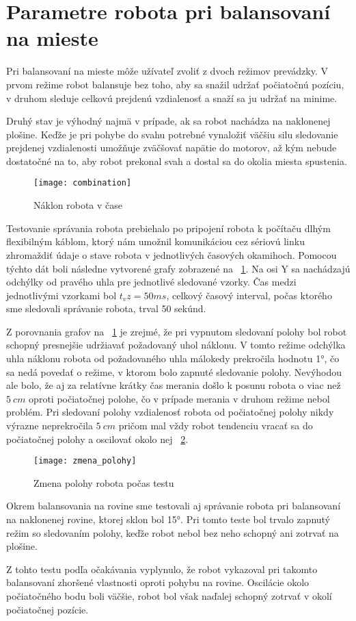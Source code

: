 \section{Parametre robota pri balansovaní na mieste}
Pri balansovaní na mieste môže užívateľ zvoliť z dvoch režimov prevádzky. V prvom režime robot balansuje bez toho, aby sa snažil udržať počiatočnú pozíciu, v druhom sleduje celkovú prejdenú vzdialenosť a snaží sa ju udržať na minime. 

Druhý stav je výhodný najmä v prípade, ak sa robot nachádza na naklonenej plošine. Keďže je pri pohybe do svahu potrebné vynaložiť väčšiu silu sledovanie prejdenej vzdialenosti umožňuje zväčšovať napätie do motorov, až kým nebude dostatočné na to, aby robot prekonal svah a dostal sa do okolia miesta spustenia.
\begin{figure}[h!]
\centering
\texttt{[image: combination]}
\caption{Náklon robota v čase}
\label{fig:combination}
\end{figure}   
Testovanie správania robota prebiehalo po pripojení robota k počítaču dlhým flexibilným káblom, ktorý nám umožnil komunikáciou cez sériovú linku zhromaždiť údaje o stave robota v jednotlivých časových okamihoch. Pomocou týchto dát boli následne vytvorené grafy zobrazené na  \figurename~\ref{fig:combination}. Na osi Y sa nachádzajú odchýlky od pravého uhla pre jednotlivé sledované vzorky. Čas medzi jednotlivými vzorkami bol $t_vz = 50ms$, celkový časový interval, počas ktorého sme sledovali správanie robota, trval 50 sekúnd.

Z porovnania grafov na \figurename~\ref{fig:combination} je zrejmé, že pri vypnutom sledovaní polohy bol robot schopný presnejšie udržiavať požadovaný uhol náklonu. V tomto režime odchýlka uhla náklonu robota od požadovaného uhla málokedy prekročila hodnotu 1°, čo sa nedá povedať o režime, v ktorom bolo zapnuté sledovanie polohy. Nevýhodou ale bolo, že aj za relatívne krátky čas merania došlo k posunu robota o viac než $5~cm$ oproti počiatočnej polohe, čo v prípade merania v druhom režime nebol problém. Pri sledovaní polohy vzdialenosť robota od počiatočnej polohy nikdy výrazne neprekročila $5~cm$ pričom mal vždy robot tendenciu vracať sa do počiatočnej polohy a oscilovať okolo nej \figurename~\ref{fig:zmena_polohy}.
 
\begin{figure}[h!]
\centering
\texttt{[image: zmena\_polohy]}
\caption{Zmena polohy robota počas testu}
\label{fig:zmena_polohy}
\end{figure}   

Okrem balansovania na rovine sme testovali aj správanie robota pri balansovaní na naklonenej rovine, ktorej sklon bol 15°. Pri tomto teste bol trvalo zapnutý režim so sledovaním polohy, keďže robot nebol bez neho schopný ani zotrvať na plošine. 

Z tohto testu podľa očakávania vyplynulo, že robot vykazoval pri takomto balansovaní zhoršené vlastnosti oproti pohybu na rovine. Oscilácie okolo počiatočného bodu boli väčšie, robot bol však naďalej schopný zotrvať v okolí počiatočnej pozície. 
